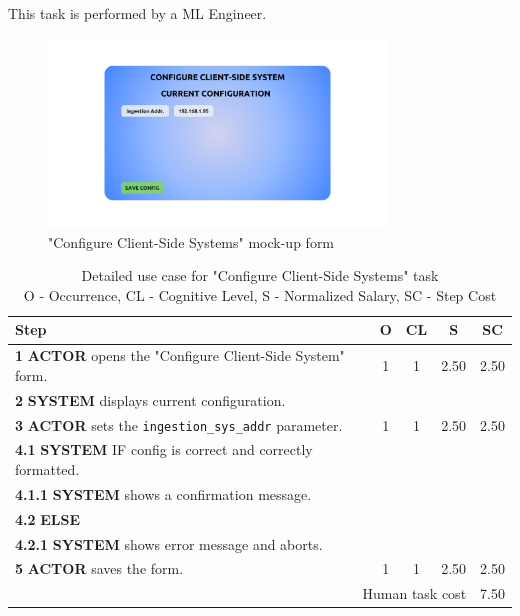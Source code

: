 This task is performed by a ML Engineer.

\begin{figure}[H]
\centering
\includegraphics[width=0.8\textwidth]{figures/ui_configure_client-side.png}
\caption{"Configure Client-Side Systems" mock-up form}
\end{figure}

\begin{table}[H]
\centering
\begin{tabularx}{\textwidth}{|X|c|c|c|c|}
\hline
\textbf{Step} & \textbf{O} & \textbf{CL} & \textbf{S} & \textbf{SC} \\
\hline
\textbf{1} \textbf{ACTOR} opens the "Configure Client-Side System" form. & 1 & 1 & 2.50 & 2.50 \\
\hline
\textbf{2} \textbf{SYSTEM} displays current configuration. & & & & \\
\hline
\textbf{3} \textbf{ACTOR} sets the \texttt{ingestion\_sys\_addr} parameter. & 1 & 1 & 2.50 & 2.50 \\
\hline
\textbf{4.1} \textbf{SYSTEM} IF config is correct and correctly formatted. & & & & \\
\hline
\textbf{4.1.1} \textbf{SYSTEM} shows a confirmation message. & & & & \\
\hline
\textbf{4.2} \textbf{ELSE} & & & & \\
\hline
\textbf{4.2.1} \textbf{SYSTEM} shows error message and aborts. & & & & \\
\hline
\textbf{5} \textbf{ACTOR} saves the form. & 1 & 1 & 2.50 & 2.50  \\
\hline
\multicolumn{4}{|r|}{Human task cost} & 7.50 \\
\hline
\end{tabularx}
\caption{Detailed use case for "Configure Client-Side Systems" task\\ 
O - Occurrence, CL - Cognitive Level, S - Normalized Salary, SC - Step Cost}
\label{table:configure_client_side}
\end{table}



